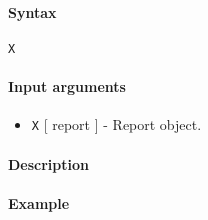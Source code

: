 


	\paragraph{Syntax}

\begin{verbatim}
X
\end{verbatim}

\paragraph{Input arguments}

\begin{itemize}
\itemsep1pt\parskip0pt
\item
  \texttt{X} {[} report {]} - Report object.
\end{itemize}

\paragraph{Description}

\paragraph{Example}


